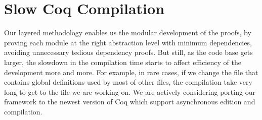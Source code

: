 \section{Slow Coq Compilation}
Our layered methodology enables us the modular development of the proofs, by proving
each module at the right abstraction level with minimum dependencies, avoiding unnecessary
tedious dependency proofs. But still, as the code base gets larger, the slowdown
in the compilation time starts to affect efficiency of the development more and more.
For example, in rare cases, if we change the file that contains global definitions used by
most of other files, the compilation take very long to get to the file we are working on.
We are actively considering porting our framework to the newest version of Coq which support
asynchronous edition and compilation.